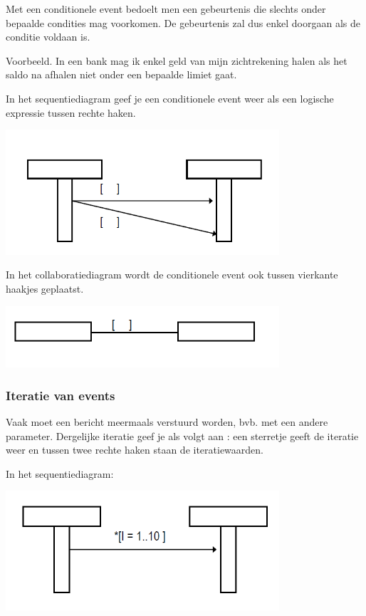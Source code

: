 Met een conditionele event bedoelt men een gebeurtenis die slechts onder bepaalde condities mag voorkomen. De gebeurtenis zal dus enkel doorgaan als de conditie voldaan is.

Voorbeeld. In een bank mag ik enkel geld van mijn zichtrekening halen als het saldo na afhalen niet onder een bepaalde limiet gaat.

In het sequentiediagram geef je een conditionele event weer als een logische expressie tussen rechte haken.


\begin{center}
\includegraphics[width=4in]{img/cond1}%
\end{center}

In het collaboratiediagram wordt de conditionele event ook tussen vierkante haakjes geplaatst.


\begin{center}
\includegraphics[width=4in]{img/cond2}%
\end{center}
\newpage
\subsubsection{Iteratie van events}

Vaak moet een bericht meermaals verstuurd worden, bvb. met een andere parameter. Dergelijke iteratie geef je als volgt aan : een sterretje geeft de iteratie weer en tussen twee rechte haken staan de iteratiewaarden.

In het sequentiediagram:


\begin{center}
\includegraphics[width=4in]{img/iter1}%
\end{center}

